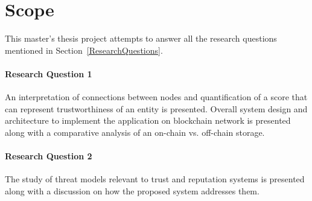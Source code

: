 \section{Scope} 
This master's thesis project attempts to answer all the research questions
mentioned in Section~\ref{ResearchQuestions}.  

\paragraph{Research Question 1 } 
An interpretation of connections between nodes and quantification of a score
that can represent trustworthiness of an entity is presented. Overall system
design and architecture to implement the application on blockchain network is
presented along with a comparative analysis of an on-chain vs. off-chain
storage.

\paragraph{Research Question 2} 
The study of threat models relevant to trust and reputation systems is
presented along with a discussion on how the proposed system addresses them. 
%


